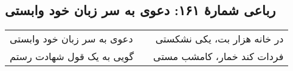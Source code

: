 \begin{center}
\section*{رباعی شمارهٔ ۱۶۱: دعوی به سر زبان خود وابستی}
\label{sec:161}
\begin{longtable}{l p{0.5cm} r}
دعوی به سر زبان خود وابستی
&&
در خانه هزار بت، یکی نشکستی
\\
گویی به یک قول شهادت رستم
&&
فردات کند خمار، کامشب مستی
\\
\end{longtable}
\end{center}
